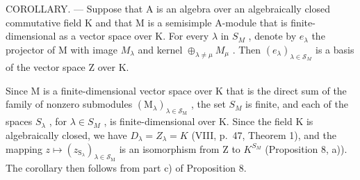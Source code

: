 COROLLARY. --- Suppose that A is an algebra over an algebraically closed commutative field K and that M is a semisimple A-module that is finite-dimensional as a vector space over K. For every \(\lambda\) in \(S_{M}\) , denote by \(e_{\lambda}\) the projector of M with image \(M_{\lambda}\) and kernel \(\oplus_{\lambda\neq\mu}M_{\mu}\) . Then \((e_{\lambda})_{\lambda\in\mathcal{S}_{M}}\) is a basis of the vector space Z over K.

Since M is a finite-dimensional vector space over K that is the direct sum of the family of nonzero submodules \((\mathrm{M}_{\lambda})_{\lambda\in\mathcal{S}_{\mathrm{M}}}\) , the set \(S_{M}\) is finite, and each of the spaces \(S_{\lambda}\) , for \(\lambda\in S_{M}\) , is finite-dimensional over K. Since the field K is algebraically closed, we have \(D_{\lambda}=Z_{\lambda}=K\) (VIII, p.~47, Theorem 1), and the mapping \(z\mapsto(z_{\mathrm{S}_{\lambda}})_{\lambda\in\mathcal{S}_{\mathrm{M}}}\) is an isomorphism from Z to \(K^{S_{M}}\) (Proposition 8, a)). The corollary then follows from part c) of Proposition 8.

